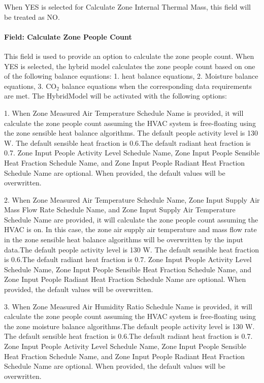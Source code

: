 When YES is selected for Calculate Zone Internal Thermal Mass, this field will be treated as NO.

\paragraph{Field: Calculate Zone People Count}\label{field-calculate-zone-people-count-rate-hm}

This field is used to provide an option to calculate the zone people count.
When YES is selected, the hybrid model calculates the zone people count based on one of the following balance equations: 1. heat balance equations, 2. Moisture balance equations, 3. CO$_2$ balance equations when the corresponding data requirements are met. The HybridModel will be activated with the following options:

1. When Zone Measured Air Temperature Schedule Name is provided, it will calculate the zone people count assuming the HVAC system is free-floating using the zone sensible heat balance algorithms. The default people activity level is 130 W. The default sensible heat fraction is 0.6.The default radiant heat fraction is 0.7. Zone Input People Activity Level Schedule Name, Zone Input People Sensible Heat Fraction Schedule Name, and Zone Input People Radiant Heat Fraction Schedule Name are optional. When provided, the default values will be overwritten.

2. When Zone Measured Air Temperature Schedule Name, Zone Input Supply Air Mass Flow Rate Schedule Name, and Zone Input Supply Air Temperature Schedule Name are provided, it will calculate the zone people count assuming the HVAC is on. In this case, the zone air supply air temperature and mass flow rate in the zone sensible heat balance algorithms will be overwritten by the input data.The default people activity level is 130 W. The default sensible heat fraction is 0.6.The default radiant heat fraction is 0.7. Zone Input People Activity Level Schedule Name, Zone Input People Sensible Heat Fraction Schedule Name, and Zone Input People Radiant Heat Fraction Schedule Name are optional. When provided, the default values will be overwritten.

3. When Zone Measured Air Humidity Ratio Schedule Name is provided, it will calculate the zone people count assuming the HVAC system is free-floating using the zone moisture balance algorithms.The default people activity level is 130 W. The default sensible heat fraction is 0.6.The default radiant heat fraction is 0.7. Zone Input People Activity Level Schedule Name, Zone Input People Sensible Heat Fraction Schedule Name, and Zone Input People Radiant Heat Fraction Schedule Name are optional. When provided, the default values will be overwritten.

